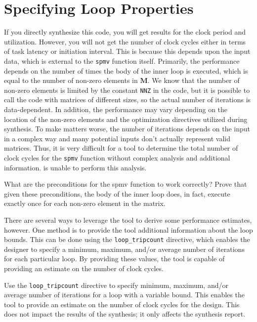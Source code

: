 \section{Specifying Loop Properties}

If you directly synthesize this code, you will get results for the clock period and utilization. However, you will not get the number of clock cycles either in terms of task latency or initiation interval. This is because this depends upon the input data, which is external to the \lstinline{spmv} function itself.  Primarily, the performance depends on the number of times the body of the inner loop is executed, which is equal to the number of non-zero elements in $\mathbf{M}$.  We know that the number of non-zero elements is limited by the constant \lstinline{NNZ} in the code, but it is possible to call the code with matrices of different sizes, so the actual number of iterations is data-dependent. In addition, the performance may vary depending on the location of the non-zero elements and the optimization directives utilized during synthesis. To make matters worse, the number of iterations depends on the input in a complex way and many potential inputs don't actually represent valid matrices. Thus, it is very difficult for a tool to determine the total number of clock cycles for the \lstinline{spmv} function without complex analysis and additional information. \VHLS is unable to perform this analysis.

\begin{exercise}
What are the preconditions for the spmv function to work correctly?  Prove that given these preconditions, the body of the inner loop does, in fact, execute exactly once for each non-zero element in the matrix.
\end{exercise}

There are several ways to leverage the tool to derive some performance estimates, however. One method is to provide the \VHLS tool additional information about the loop bounds. This can be done using the \lstinline{loop_tripcount} directive, which enables the designer to specify a minimum, maximum, and/or average number of iterations for each particular loop. By providing these values, the \VHLS tool is capable of providing an estimate on the number of clock cycles. 

\begin{aside}
Use the \lstinline{loop_tripcount} directive to specify minimum, maximum, and/or average number of iterations for a loop with a variable bound. This enables the \VHLS tool to provide an estimate on the number of clock cycles for the design. This does not impact the results of the synthesis; it only affects the synthesis report.
\end{aside}

